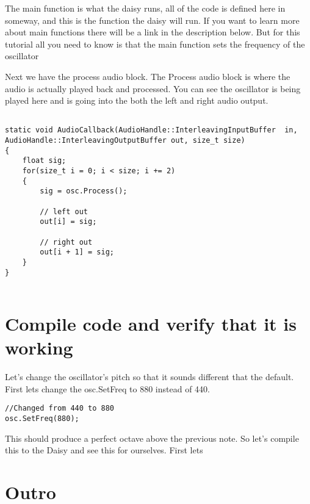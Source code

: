 \documentclass[12pt]{article}
\begin{document}
The main function is what the daisy runs, all of the code is defined here in someway, and this is the function the daisy will run. If you want to learn more about main functions there will be a link in the description below. But for this tutorial all you need to know is that the main function sets the frequency of the oscillator 

Next we have the process audio block. The Process audio block is where the audio is actually played back and processed. You can see the oscillator is being played here and is going into the both the left and right audio output.

\begin{lstlisting}

static void AudioCallback(AudioHandle::InterleavingInputBuffer  in, AudioHandle::InterleavingOutputBuffer out, size_t size)
{
    float sig;
    for(size_t i = 0; i < size; i += 2)
    {
        sig = osc.Process();

        // left out
        out[i] = sig;

        // right out
        out[i + 1] = sig;
    }
}
 
\end{lstlisting}

\section{Compile code and verify that it is working}
Let's change the oscillator's pitch so that it sounds different that the default. First lets change the osc.SetFreq to 880 instead of 440. 

\begin{lstlisting}
//Changed from 440 to 880
osc.SetFreq(880);
\end{lstlisting}

This should produce a perfect octave above the previous note. So let's compile this to the Daisy and see this for ourselves. First lets 


\section{Outro}
\end{document}
